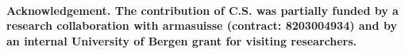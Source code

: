 \documentclass[11pt,theapa]{article}
\theoremstyle{plain}
\begin{document}

\paragraph{Acknowledgement. The contribution of C.S. was partially funded by a research collaboration with armasuisse (contract: 8203004934) and by an internal University of Bergen grant for visiting researchers.}


\end{document}
